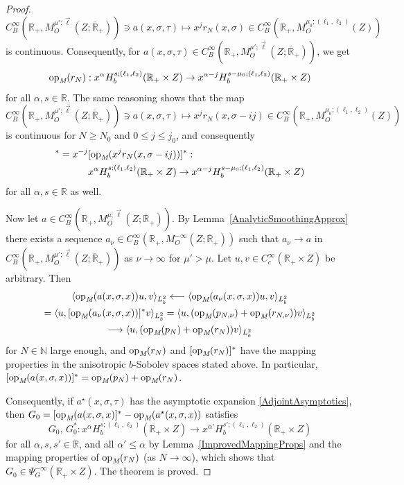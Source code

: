 \documentclass[reqno]{amsart}
\numberwithin{equation}{section}
\theoremstyle{definition}
\def\N{\mathbb N}
\def\R{\mathbb R}
\def\opm{\textup{op}_{\textit{M}}}
\begin{document}
\begin{proof}
$$
C^{\infty}_B(\R_+,M^{\mu';\vec{\ell}}_O(Z;\overline{\R}_+)) \ni a(x,\sigma,\tau) \mapsto x^jr_N(x,\sigma) \in C^{\infty}_B(\R_+,M^{\mu_0;(\ell_1,\ell_2)}_O(Z))
$$
is continuous. Consequently, for $a(x,\sigma,\tau) \in C^{\infty}_B(\R_+,M^{\mu';\vec{\ell}}_O(Z;\overline{\R}_+))$, we get
$$
\opm(r_N) : x^{\alpha}H^{s;(\ell_1,\ell_2)}_b(\R_+\times Z) \to x^{\alpha-j}H^{s-\mu_0;(\ell_1,\ell_2)}_b(\R_+\times Z)
$$
for all $\alpha,s \in \R$. The same reasoning shows that the map
$$
C^{\infty}_B(\R_+,M^{\mu';\vec{\ell}}_O(Z;\overline{\R}_+)) \ni a(x,\sigma,\tau) \mapsto x^jr_N(x,\sigma-ij) \in C^{\infty}_B(\R_+,M^{\mu_0;(\ell_1,\ell_2)}_O(Z))
$$
is continuous for $N \geq N_0$ and $0 \leq j \leq j_0$, and consequently
\begin{align*}
[\opm(r_N)]^* = x^{-j}&[\opm(x^jr_N(x,\sigma-ij))]^* : \\
&x^{\alpha}H^{s;(\ell_1,\ell_2)}_b(\R_+\times Z) \to x^{\alpha-j}H^{s-\mu_0;(\ell_1,\ell_2)}_b(\R_+\times Z)
\end{align*}
for all $\alpha,s \in \R$ as well.

Now let $a \in C^{\infty}_B(\R_+,M^{\mu;\vec{\ell}}_O(Z;\overline{\R}_+))$. By Lemma~\ref{AnalyticSmoothingApprox} there exists a sequence $a_{\nu} \in C^{\infty}_B(\R_+,M^{-\infty}_O(Z;\overline{\R}_+))$ such that $a_{\nu} \to a$ in $C^{\infty}_B(\R_+,M^{\mu';\vec{\ell}}_O(Z;\overline{\R}_+))$ as $\nu \to \infty$ for $\mu' > \mu$. Let $u,v \in C_c^{\infty}(\R_+\times Z)$ be arbitrary. Then
\begin{gather*}
\langle \opm(a(x,\sigma,x))u,v \rangle_{L^2_b} \longleftarrow \langle \opm(a_{\nu}(x,\sigma,x))u,v \rangle_{L^2_b} \\
= \langle u,[\opm(a_{\nu}(x,\sigma,x))]^*v \rangle_{L^2_b} 
= \langle u, (\opm(p_{N,\nu}) + \opm(r_{N,\nu}))v \rangle_{L^2_b} \\
\longrightarrow \langle u, (\opm(p_{N}) + \opm(r_{N}))v \rangle_{L^2_b}
\end{gather*}
for $N \in \N$ large enough, and $\opm(r_N)$ and $[\opm(r_N)]^*$ have the mapping properties in the anisotropic $b$-Sobolev spaces stated above. In particular, $[\opm(a(x,\sigma,x))]^* = \opm(p_N) + \opm(r_N)$.

Consequently, if $a^{\star}(x,\sigma,\tau)$ has the asymptotic expansion \eqref{AdjointAsymptotics}, then $G_0 = [\opm(a(x,\sigma,x)]^* - \opm(a^{\star}(x,\sigma,x))$ satisfies
$$
G_0,\,G_0^* : x^{\alpha}H^{s;(\ell_1,\ell_2)}_b(\R_+\times Z) \to x^{\alpha'}H^{s';(\ell_1,\ell_2)}_b(\R_+\times Z)
$$
for all $\alpha,s,s' \in \R$, and all $\alpha' \leq \alpha$ by Lemma~\ref{ImprovedMappingProps} and the mapping properties of $\opm(r_N)$ (as $N \to \infty$), which shows that $G_0 \in \Psi^{-\infty}_G(\R_+\times Z)$. The theorem is proved.
\end{proof}
\end{document}
